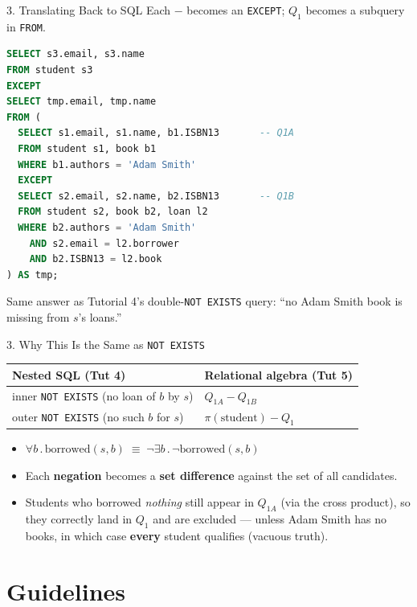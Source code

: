 \documentclass{beamer}
\begin{document}
\begin{frame}[fragile]{3. Translating Back to SQL}
\footnotesize
Each $-$ becomes an \texttt{EXCEPT}; $Q_1$ becomes a subquery in \texttt{FROM}.
\begin{lstlisting}[language=SQL,basicstyle=\ttfamily\scriptsize]
SELECT s3.email, s3.name
FROM student s3
EXCEPT
SELECT tmp.email, tmp.name
FROM (
  SELECT s1.email, s1.name, b1.ISBN13       -- Q1A
  FROM student s1, book b1
  WHERE b1.authors = 'Adam Smith'
  EXCEPT
  SELECT s2.email, s2.name, b2.ISBN13       -- Q1B
  FROM student s2, book b2, loan l2
  WHERE b2.authors = 'Adam Smith'
    AND s2.email = l2.borrower
    AND b2.ISBN13 = l2.book
) AS tmp;
\end{lstlisting}
Same answer as Tutorial 4's double-\texttt{NOT EXISTS} query: ``no Adam Smith book is missing from $s$'s loans.''
\end{frame}

\begin{frame}{3. Why This Is the Same as \texttt{NOT EXISTS}}
\small
\begin{center}
\renewcommand{\arraystretch}{1.3}
\begin{tabular}{ll}
\toprule
\textbf{Nested SQL (Tut 4)} & \textbf{Relational algebra (Tut 5)} \\
\midrule
inner \texttt{NOT EXISTS} (no loan of $b$ by $s$) & $Q_{1A} - Q_{1B}$ \\
outer \texttt{NOT EXISTS} (no such $b$ for $s$) & $\pi(\text{student}) - Q_1$ \\
\bottomrule
\end{tabular}
\end{center}
\medskip
\begin{itemize}
  \item $\forall b\,.\,\text{borrowed}(s,b) \;\equiv\; \neg\exists b\,.\,\neg\text{borrowed}(s,b)$
  \item Each \textbf{negation} becomes a \textbf{set difference} against the set of all candidates.
  \item Students who borrowed \emph{nothing} still appear in $Q_{1A}$ (via the cross product), so they correctly land in $Q_1$ and are excluded --- unless Adam Smith has no books, in which case \textbf{every} student qualifies (vacuous truth).
\end{itemize}
\end{frame}

\section{Guidelines}
\end{document}
